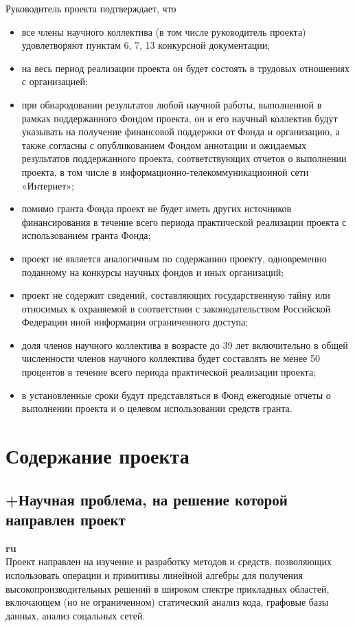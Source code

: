 \documentclass[12pt]{article}  %
\theoremstyle{remark}
\begin{document}
\vline
Руководитель проекта подтверждает, что
\begin{itemize}
\item все члены научного коллектива (в том числе руководитель проекта) удовлетворяют пунктам 6, 7, 13 конкурсной документации;
\item на весь период реализации проекта он будет состоять в трудовых отношениях с организацией;
\item при обнародовании результатов любой научной работы, выполненной в рамках поддержанного Фондом проекта, он и его научный коллектив будут указывать на получение финансовой поддержки от Фонда и организацию, а также согласны с опубликованием Фондом аннотации и ожидаемых результатов поддержанного проекта, соответствующих отчетов о выполнении проекта, в том числе в информационно-телекоммуникационной сети «Интернет»;
\item помимо гранта Фонда проект не будет иметь других источников финансирования в течение всего периода практической реализации проекта с использованием гранта Фонда;
\item проект не является аналогичным по содержанию проекту, одновременно поданному на конкурсы научных фондов и иных организаций;
\item проект не содержит сведений, составляющих государственную тайну или относимых к охраняемой в соответствии с законодательством Российской Федерации иной информации ограниченного доступа;
\item доля членов научного коллектива в возрасте до 39 лет включительно в общей численности членов научного коллектива будет составлять не менее 50 процентов в течение всего периода практической реализации проекта;
\item в установленные сроки будут представляться в Фонд ежегодные отчеты о выполнении проекта и о целевом использовании средств гранта.
\end{itemize}

\section{Содержание проекта}

\subsection{+Научная проблема, на решение которой направлен проект}

\textbf{ru}\\
%
Проект направлен на изучение и разработку методов и средств, позволяющих использовать операции и примитивы линейной алгебры для получения высокопроизводительных решений в широком спектре прикладных областей, включающем (но не ограниченном) статический анализ кода, графовые базы данных, анализ соцальных сетей.
\end{document}
